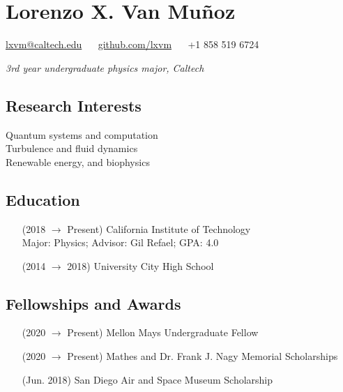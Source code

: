 \documentclass{article}
\begin{document}
{\centering

\section*{Lorenzo X. Van Muñoz}

\href{mailto:lxvm@caltech.edu}{lxvm@caltech.edu}
$\quad$
\href{https://github.com/lxvm}{github.com/lxvm}
$\quad$
+1 858 519 6724

\textit{3rd year undergraduate physics major, Caltech}

}


\begin{multicols}{2}

\subsection*{Research Interests}

\noindent Quantum systems and computation \\
\noindent Turbulence and fluid dynamics \\
\noindent Renewable energy, and biophysics


\subsection*{Education}

\begin{enumerate}
    \item [(2018 $\to$ Present)] California Institute of Technology \\
        Major: Physics; Advisor: Gil Refael; GPA: 4.0
    \item [(2014 $\to$ 2018)] University City High School
\end{enumerate}

\end{multicols}


\subsection*{Fellowships and Awards}

\begin{enumerate}
    \item [(2020 $\to$ Present)] Mellon Mays Undergraduate Fellow
    \item [(2020 $\to$ Present)] Mathes and Dr. Frank J. Nagy Memorial Scholarships
    \item [(Jun. 2018)] San Diego Air and Space Museum Scholarship
\end{enumerate}
\end{document}
